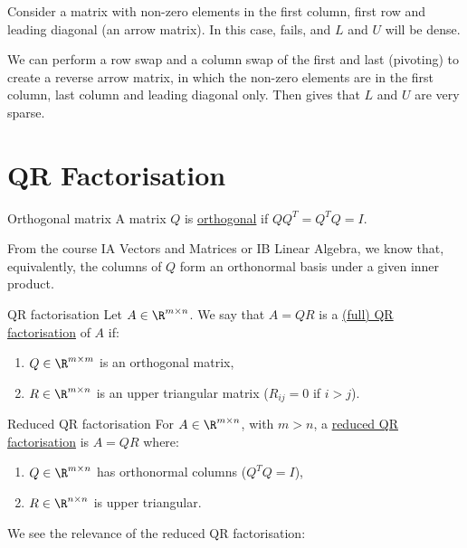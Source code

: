 \documentclass[../Main.tex]{subfiles}
\begin{document}
\begin{example}
    Consider a matrix with non-zero elements in the first column, first row and leading diagonal (an arrow matrix). In this case,  fails, and $L$ and $U$ will be dense.

    We can perform a row swap and a column swap of the first and last (pivoting) to create a reverse arrow matrix, in which the non-zero elements are in the first column, last column and leading diagonal only. Then  gives that $L$ and $U$ are very sparse.
\end{example}
\section{QR Factorisation}
\begin{definition}{Orthogonal matrix}
    A matrix $Q$ is \underline{orthogonal} if $QQ^T = Q^TQ = I$.
\end{definition}
From the course IA Vectors and Matrices or IB Linear Algebra, we know that, equivalently, the columns of $Q$ form an orthonormal basis under a given inner product.
\begin{definition}{QR factorisation}
    Let $A \in \R^{m \times n}$. We say that $A = QR$ is a \underline{(full) QR factorisation} of $A$ if:
    \begin{enumerate}
        \item $Q \in \R^{m \times m}$ is an orthogonal matrix,
        \item $R \in \R^{m \times n}$ is an upper triangular matrix ($R_{ij} = 0$ if $i > j$).
    \end{enumerate}
\end{definition}
\begin{definition}{Reduced QR factorisation}
    For $A \in \R^{m \times n}$, with $m > n$, a \underline{reduced QR factorisation} is $A = QR$ where:
    \begin{enumerate}
        \item $Q \in \R^{m \times n}$ has orthonormal columns ($Q^TQ = I$),
        \item $R \in \R^{n \times n}$ is upper triangular.
    \end{enumerate}
\end{definition}
We see the relevance of the reduced QR factorisation:
\end{document}
